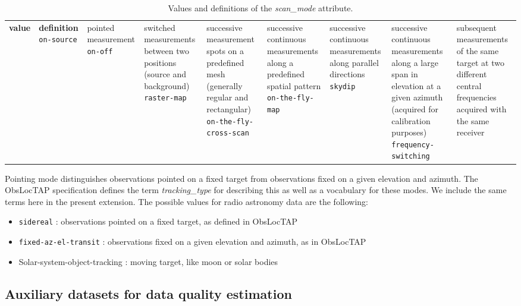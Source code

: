 \documentclass[11pt,a4paper]{ivoa}
\begin{document}
\begin{longtable}{ | p{4.5cm}| p{7cm}|  }
\hline
	\textbf{value}&\textbf{definition}\cr
\hline
\hline
	\texttt{on-source}&pointed measurement\cr
\hline
	\texttt{on-off}&switched measurements between two positions (source and background)\cr
\hline
	\texttt{raster-map}&successive measurement spots on a predefined mesh (generally regular and rectangular)\cr
\hline
	\texttt{on-the-fly-cross-scan}&successive continuous measurements  along a predefined spatial pattern\cr
\hline
	\texttt{on-the-fly-map}&successive continuous measurements along parallel directions\cr
\hline
	\texttt{skydip}&successive continuous measurements along a large span in elevation at a given azimuth (acquired for calibration purposes)\cr
\hline
	\texttt{frequency-switching}&subsequent measurements of the same target at two different central frequencies acquired with the same receiver \cr

\hline
\caption{Values and definitions of the \emph{scan\_mode} attribute.}
\label{tab:scanmode}
\end{longtable}

Pointing mode distinguishes observations pointed on a fixed target from  
observations fixed on a given elevation and azimuth. 
The ObsLocTAP specification \citep{2021ivoa.spec.0724S} defines the term 
\emph{tracking\_type} for describing this as well as a  vocabulary for 
these modes. We include the same terms here in the present extension. The  
possible values for radio astronomy data are the following:
\begin{itemize}
	\item \texttt{sidereal} : observations pointed on a fixed target, as defined in 
		ObsLocTAP
	\item \texttt{fixed-az-el-transit} : observations fixed on a given elevation 
		and azimuth, as in ObsLocTAP
	\item Solar-system-object-tracking : moving target, like moon or solar bodies
\end{itemize}

\subsection{Auxiliary datasets  for data quality estimation}
\end{document}
